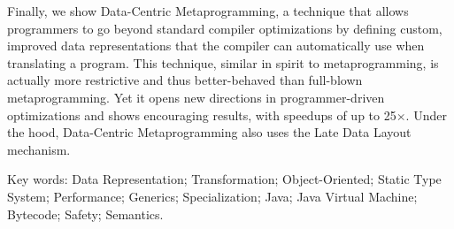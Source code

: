 \vspace{0.5em}

Finally, we show Data-Centric Metaprogramming, a technique that allows programmers to go beyond standard compiler optimizations by defining custom, improved data representations that the compiler can automatically use when translating a program. This technique, similar in spirit to metaprogramming, is actually more restrictive and thus better-behaved than full-blown metaprogramming. Yet it opens new directions in programmer-driven optimizations and shows encouraging results, with speedups of up to 25$\times$. Under the hood, Data-Centric Metaprogramming also uses the Late Data Layout mechanism.

\vspace{0.5em}


Key words:
Data Representation; Transformation; Object-Oriented; Static Type System; Performance; Generics; Specialization; Java; Java Virtual Machine; Bytecode; Safety; Semantics.









